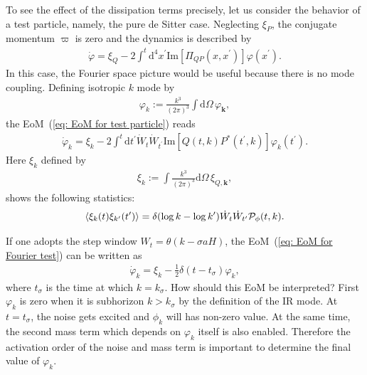 \documentclass[aps, prd
, preprint
, nofootinbib 
]{revtex4-1}
\newcommand{\dd}{\mathrm{d}}
\newcommand{\calP}{\mathcal{P}}
\renewcommand{\Im}{\mathrm{Im}}
\newcommand{\bae}[1]{\begin{align} #1 \end{align}}
\begin{document}
\bigskip
To see the effect of the dissipation terms precisely, let us consider the behavior of a test particle, namely, the pure de Sitter case.
Neglecting $\xi_P$, the conjugate momentum $\varpi$ is zero and the dynamics is described by
\bae{\label{eq: EoM for test particle}
	\dot{\varphi}=\xi_Q-2\int^t\dd^4x^\prime\Im[\Pi_{QP}(x,x^\prime)]\varphi(x^\prime).
}
In this case, the Fourier space picture would be useful because there is no mode coupling.
Defining isotropic $k$ mode by
\bae{
	\varphi_k:=\frac{k^3}{(2\pi)^3}\int\dd\Omega\,\varphi_\mathbf{k},
}
the EoM~(\ref{eq: EoM for test particle}) reads
\bae{\label{eq: EoM for Fourier test}
	\dot{\varphi}_k=\xi_k-2\int^t\dd t^\prime\dot{W}_t\dot{W}_{t^\prime}\Im[Q(t,k)P^*(t^\prime,k)]\varphi_k(t^\prime).
}
Here $\xi_k$ defined by
\bae{
	\xi_k:=\int\frac{k^3}{(2\pi)^3}\dd\Omega\,\xi_{Q,\mathbf{k}},
}
shows the following statistics:
\bae{
	\braket{\xi_k(t)\xi_{k^\prime}(t^\prime)}=\delta(\log k-\log k^\prime)\dot{W}_t\dot{W}_{t^\prime}\calP_\phi(t,k).
}

If one adopts the step window $W_t=\theta(k-\sigma aH)$, the EoM~(\ref{eq: EoM for Fourier test}) can be written as
\bae{
	\dot{\varphi}_k=\xi_k-\frac{1}{2}\delta(t-t_\sigma)\varphi_k,
}
where $t_\sigma$ is the time at which $k=k_\sigma$. How should this EoM be interpreted? First $\varphi_k$ is zero when it is subhorizon 
$k>k_\sigma$ by the definition of the IR mode. At $t=t_\sigma$, the noise gets excited and $\phi_k$ will has non-zero value.
At the same time, the second mass term which depends on $\varphi_k$ itself is also enabled.
Therefore the activation order of the noise and mass term is important to determine the final value of $\varphi_k$.
\end{document}
